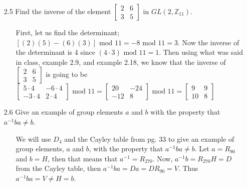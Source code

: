 \documentclass[12pt]{article}
\begin{document}
\begin{enumerate}
\item[2.5] Find the inverse of the element 
$\left[ \begin{array}{cc} 2 & 6 \\ 3 & 5 \end{array} \right]$ in $GL(2, \mathbb{Z}_{11})$.
\begin{enumerate}
\item[] First, let us find the determinant; $[(2)(5) - (6)(3)]\mbox{ mod } 11 = -8\mbox{ mod } 11 = 3$.
Now the inverse of the determinant is 4 since $(4 \cdot 3) \mbox{ mod } 11 = 1$. Then 
using what was said in class, example 2.9, and example 2.18, we know that the inverse of
$\left[ \begin{array}{cc} 2 & 6 \\ 3 & 5 \end{array} \right]$ is going to be
$\left[ \begin{array}{cc} 5 \cdot 4 & -6 \cdot 4 \\ -3 \cdot 4 & 2 \cdot 4 \end{array} \right] \mbox{ mod } 11 
= \left[ \begin{array}{cc} 20 & -24 \\ -12 & 8 \end{array} \right] \mbox{ mod } 11 = 
\left[ \begin{array}{cc} 9 & 9 \\ 10 & 8 \end{array} \right]$
\end{enumerate}


\item[2.6] Give an example of group elements $a$ and $b$ with the property that $a^{-1}ba \neq b$.
\begin{enumerate}
\item[] We will use $D_4$ and the Cayley table from pg. 33 to give an example of group elements, $a$
and $b$, with the property that $a^{-1}ba \neq b$. Let $a = R_{90}$ and $b = H$, then that means
that $a^{-1} = R_{270}$. Now, $a^{-1}b = R_{270}H = D$ from the Cayley table, then 
$a^{-1}ba = Da = DR_{90} = V$. Thus $a^{-1}ba = V \neq H = b$.
\end{enumerate}



\end{enumerate}
\end{document}
